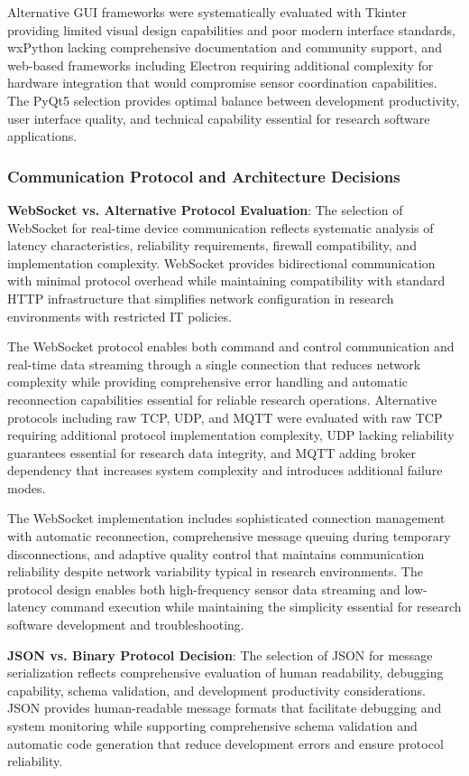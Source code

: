 \documentclass[12pt,a4paper]{article}
\begin{document}
Alternative GUI frameworks were systematically evaluated with Tkinter providing limited visual design capabilities and
poor modern interface standards, wxPython lacking comprehensive documentation and community support, and web-based
frameworks including Electron requiring additional complexity for hardware integration that would compromise sensor
coordination capabilities. The PyQt5 selection provides optimal balance between development productivity, user interface
quality, and technical capability essential for research software applications.

\subsubsection{Communication Protocol and Architecture Decisions}

\textbf{WebSocket vs. Alternative Protocol Evaluation}: The selection of WebSocket for real-time device communication
reflects systematic analysis of latency characteristics, reliability requirements, firewall compatibility, and
implementation complexity. WebSocket provides bidirectional communication with minimal protocol overhead while
maintaining compatibility with standard HTTP infrastructure that simplifies network configuration in research
environments with restricted IT policies.

The WebSocket protocol enables both command and control communication and real-time data streaming through a single
connection that reduces network complexity while providing comprehensive error handling and automatic reconnection
capabilities essential for reliable research operations. Alternative protocols including raw TCP, UDP, and MQTT were
evaluated with raw TCP requiring additional protocol implementation complexity, UDP lacking reliability guarantees
essential for research data integrity, and MQTT adding broker dependency that increases system complexity and introduces
additional failure modes.

The WebSocket implementation includes sophisticated connection management with automatic reconnection, comprehensive
message queuing during temporary disconnections, and adaptive quality control that maintains communication reliability
despite network variability typical in research environments. The protocol design enables both high-frequency sensor
data streaming and low-latency command execution while maintaining the simplicity essential for research software
development and troubleshooting.

\textbf{JSON vs. Binary Protocol Decision}: The selection of JSON for message serialization reflects comprehensive evaluation
of human readability, debugging capability, schema validation, and development productivity considerations. JSON
provides human-readable message formats that facilitate debugging and system monitoring while supporting comprehensive
schema validation and automatic code generation that reduce development errors and ensure protocol reliability.
\end{document}
